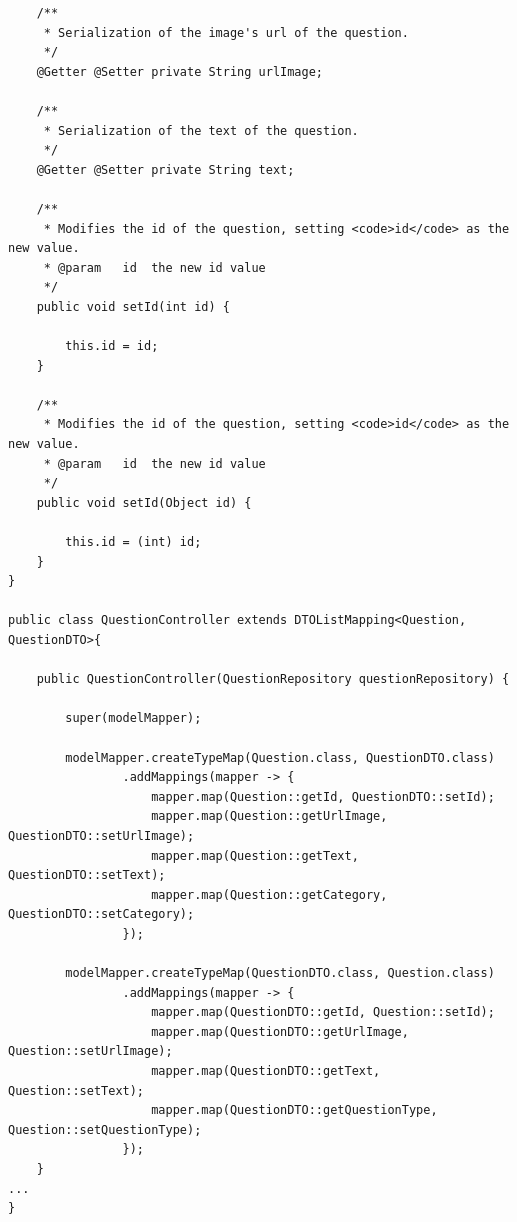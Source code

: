 \documentclass[12pt]{article}
\begin{document}
\begin{itemize}
\begin{lstlisting}
	/**
	 * Serialization of the image's url of the question.
	 */
	@Getter	@Setter private String urlImage;
	
	/**
	 * Serialization of the text of the question.
	 */
	@Getter	@Setter private String text;

	/**
	 * Modifies the id of the question, setting <code>id</code> as the new value.
	 * @param	id	the new id value
	 */
	public void setId(int id) {

		this.id = id;
	}

	/**
	 * Modifies the id of the question, setting <code>id</code> as the new value.
	 * @param	id	the new id value
	 */
	public void setId(Object id) {

		this.id = (int) id;
	}
}

public class QuestionController extends DTOListMapping<Question, QuestionDTO>{

	public QuestionController(QuestionRepository questionRepository) {

		super(modelMapper);

		modelMapper.createTypeMap(Question.class, QuestionDTO.class)
				.addMappings(mapper -> {
					mapper.map(Question::getId, QuestionDTO::setId);
					mapper.map(Question::getUrlImage, QuestionDTO::setUrlImage);
					mapper.map(Question::getText, QuestionDTO::setText);
					mapper.map(Question::getCategory, QuestionDTO::setCategory);
				});

		modelMapper.createTypeMap(QuestionDTO.class, Question.class)
				.addMappings(mapper -> {
					mapper.map(QuestionDTO::getId, Question::setId);
					mapper.map(QuestionDTO::getUrlImage, Question::setUrlImage);
					mapper.map(QuestionDTO::getText, Question::setText);
					mapper.map(QuestionDTO::getQuestionType, Question::setQuestionType);
				});
	}
...
}
            \end{lstlisting}
		\end{itemize}
		
\end{document}
